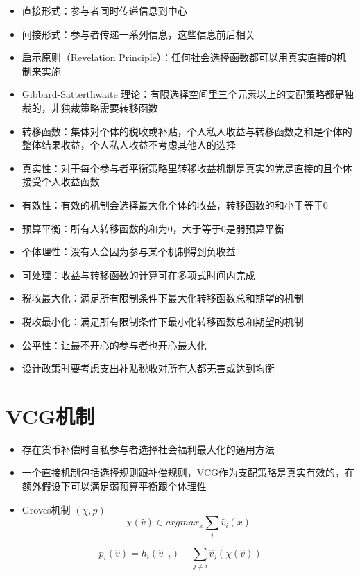 \documentclass[]{book}
\providecommand{\tightlist}{%
  \setlength{\itemsep}{0pt}\setlength{\parskip}{0pt}}
\begin{document}
\begin{itemize}
\tightlist
\item
  直接形式：参与者同时传递信息到中心
\item
  间接形式：参与者传递一系列信息，这些信息前后相关
\item
  启示原则（Revelation Principle）：任何社会选择函数都可以用真实直接的机制来实施
\item
  Gibbard-Satterthwaite 理论：有限选择空间里三个元素以上的支配策略都是独裁的，非独裁策略需要转移函数
\item
  转移函数：集体对个体的税收或补贴，个人私人收益与转移函数之和是个体的整体结果收益，个人私人收益不考虑其他人的选择
\item
  真实性：对于每个参与者平衡策略里转移收益机制是真实的党是直接的且个体接受个人收益函数
\item
  有效性：有效的机制会选择最大化个体的收益，转移函数的和小于等于0
\item
  预算平衡：所有人转移函数的和为0，大于等于0是弱预算平衡
\item
  个体理性：没有人会因为参与某个机制得到负收益
\item
  可处理：收益与转移函数的计算可在多项式时间内完成
\item
  税收最大化：满足所有限制条件下最大化转移函数总和期望的机制
\item
  税收最小化：满足所有限制条件下最小化转移函数总和期望的机制
\item
  公平性：让最不开心的参与者也开心最大化
\item
  设计政策时要考虑支出补贴税收对所有人都无害或达到均衡
\end{itemize}

\hypertarget{vcgux673aux5236}{%
\section{VCG机制}\label{vcgux673aux5236}}

\begin{itemize}
\tightlist
\item
  存在货币补偿时自私参与者选择社会福利最大化的通用方法
\item
  一个直接机制包括选择规则跟补偿规则，VCG作为支配策略是真实有效的，在额外假设下可以满足弱预算平衡跟个体理性
\item
  Groves机制 \((\chi,p)\)
  \[\chi (\hat v) \in arg max_x \sum_i \hat v_i(x)\]
\end{itemize}

\[p_i(\hat v) = h_i(\hat v_{-i}) - \sum_{j\neq i} \hat v_j(\chi(\hat v))\]
\end{document}
